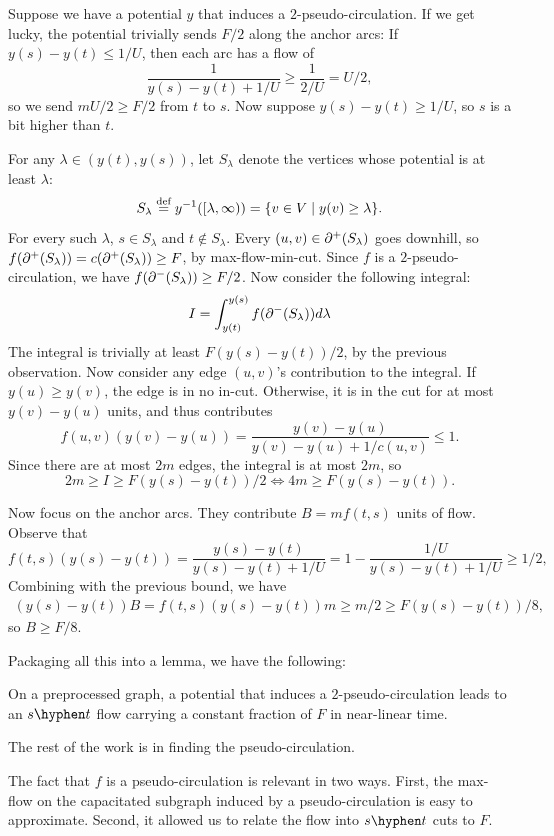 \documentclass[12pt]{article}
\begin{document}
Suppose we have a potential $y$ that induces a $2$-pseudo-circulation. If we get
lucky, the potential trivially sends $F/2$ along the anchor arcs: If
$y(s) - y(t) \leq 1/U$, then each arc has a flow of
\[
  \frac{1}{y(s) - y(t) + 1/U} \geq \frac{1}{2/U} = U/2,
\]
so we send $mU/2 \geq F/2$ from $t$ to $s$. Now suppose $y(s) - y(t) \geq 1/U$,
so $s$ is a bit higher than $t$.

For any $\lambda \in (y(t), y(s))$, let $S_\lambda$ denote the vertices whose
potential is at least $\lambda$:
\[
  S_\lambda \defeq y^{-1}([\lambda, \infty)) = \Set{v \in V \mid y(v) \geq \lambda}.
\]
For every such $\lambda$, $s \in S_\lambda$ and $t \notin S_\lambda$. Every
$(u, v) \in \outcut{S_\lambda}$ goes downhill, so
$f(\outcut{S_\lambda}) = c(\outcut{S_\lambda}) \geq F$, by max-flow-min-cut.
Since $f$ is a $2$-pseudo-circulation, we have $f(\incut{S_\lambda}) \geq F/2$.
Now consider the following integral:
\[
  I = \int_{y(t)}^{y(s)} f(\incut{S_\lambda})d\lambda
\]
The integral is trivially at least $F(y(s) - y(t))/2$, by the previous
observation. Now consider any edge $(u, v)$'s contribution to the integral. If
$y(u) \geq y(v)$, the edge is in no in-cut. Otherwise, it is in the cut for at
most $y(v) - y(u)$ units, and thus contributes
\[
  f(u, v)(y(v) - y(u)) = \frac{y(v) - y(u)}{y(v) - y(u) + 1/c(u, v)} \leq 1.
\]
Since there are at most $2m$ edges, the integral is at most $2m$, so
\[
  2m \geq I \geq F(y(s) - y(t))/2 \Longleftrightarrow 4m \geq F(y(s) - y(t)).
\]

Now focus on the anchor arcs. They contribute $B = mf(t, s)$ units of flow.
Observe that
\[
  f(t, s)(y(s) - y(t)) =    \frac{y(s) - y(t)}{y(s) - y(t) + 1/U}
                       =    1 - \frac{1/U}{y(s) - y(t) + 1/U}
                       \geq 1/2,
\]
Combining with the previous bound, we have
\begin{align*}
  (y(s) - y(t))B = f(t, s)(y(s) - y(t))m \geq m/2 \geq F(y(s) - y(t))/8,
\end{align*}
so $B \geq F/8$.

Packaging all this into a lemma, we have the following:
\begin{lemma}
  On a preprocessed graph, a potential that induces a $2$-pseudo-circulation
  leads to an $s \hyphen t$ flow carrying a constant fraction of $F$ in
  near-linear time.
\end{lemma}
The rest of the work is in finding the pseudo-circulation.

\begin{remark}
  The fact that $f$ is a pseudo-circulation is relevant in two ways. First, the
  max-flow on the capacitated subgraph induced by a pseudo-circulation is easy
  to approximate. Second, it allowed us to relate the flow into $s \hyphen t$
  cuts to $F$.
\end{remark}
\end{document}
